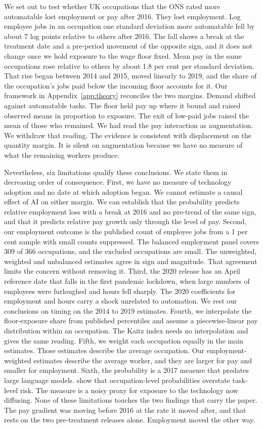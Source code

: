 \documentclass[12pt,leqno]{article}
\begin{document}
We set out to test whether UK occupations that the ONS rated more automatable lost employment or pay after 2016. They lost employment. Log employee jobs in an occupation one standard deviation more automatable fell by about 7 log points relative to others after 2016. The fall shows a break at the treatment date and a pre-period movement of the opposite sign, and it does not change once we hold exposure to the wage floor fixed. Mean pay in the same occupations rose relative to others by about 1.8 per cent per standard deviation. That rise began between 2014 and 2015, moved linearly to 2019, and the share of the occupation's jobs paid below the incoming floor accounts for it. Our framework in Appendix~\ref{app:theory} reconciles the two margins. Demand shifted against automatable tasks. The floor held pay up where it bound and raised observed means in proportion to exposure. The exit of low-paid jobs raised the mean of those who remained. We had read the pay interaction as augmentation. We withdraw that reading. The evidence is consistent with displacement on the quantity margin. It is silent on augmentation because we have no measure of what the remaining workers produce.

Nevertheless, six limitations qualify these conclusions. We state them in decreasing order of consequence. First, we have no measure of technology adoption and no date at which adoption began. We cannot estimate a causal effect of AI on either margin. We can establish that the probability predicts relative employment loss with a break at 2016 and no pre-trend of the same sign, and that it predicts relative pay growth only through the level of pay. Second, our employment outcome is the published count of employee jobs from a 1 per cent sample with small counts suppressed. The balanced employment panel covers 309 of 366 occupations, and the excluded occupations are small. The unweighted, weighted and unbalanced estimates agree in sign and magnitude. That agreement limits the concern without removing it. Third, the 2020 release has an April reference date that falls in the first pandemic lockdown, when large numbers of employees were furloughed and hours fell sharply. The 2020 coefficients for employment and hours carry a shock unrelated to automation. We rest our conclusions on timing on the 2014 to 2019 estimates. Fourth, we interpolate the floor-exposure share from published percentiles and assume a piecewise-linear pay distribution within an occupation. The Kaitz index needs no interpolation and gives the same reading. Fifth, we weight each occupation equally in the main estimates. Those estimates describe the average occupation. Our employment-weighted estimates describe the average worker, and they are larger for pay and smaller for employment. Sixth, the probability is a 2017 measure that predates large language models. \citet{arntz2017revisiting} show that occupation-level probabilities overstate task-level risk. The measure is a noisy proxy for exposure to the technology now diffusing. None of these limitations touches the two findings that carry the paper. The pay gradient was moving before 2016 at the rate it moved after, and that rests on the two pre-treatment releases alone. Employment moved the other way.
\end{document}
